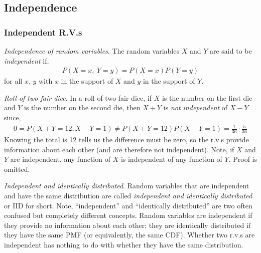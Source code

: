 \subsection{Independence}

\subsubsection{Independent R.V.s}

\emph{Independence of random variables}. 
 The random variables \(X\) and \(Y\) are said to be \emph{independent} if,
\begin{align}
P(X = x,\ Y = y) = P(X = x)P(Y = y)
\end{align}
for all \(x\), \(y\) with \(x\) in the support of \(X\) and \(y\) in the support of \(Y\).

\emph{Roll of two fair dice}. 
In a roll of two fair dice, 
if \(X\) is the number on the first die and \(Y\) is the number on the second die,
then \(X + Y\) is \emph{not independent} of \(X - Y\) since,
\begin{align}
0 = P(X + Y = 12,X - Y = 1) \neq P(X + Y = 12)P(X - Y = 1) = \frac{1}{36} \cdot \frac{5}{36}
\end{align}
Knowing the total is 12 tells us the difference must be zero, 
so the r.v.s provide information about each other (and are therefore not independent). 
Note, if \(X\) and \(Y\) are independent, any function of
\(X\) is independent of any function of \(Y\). 
Proof is omitted.

\emph{Independent and identically distributed}. 
Random variables that are independent and have the same distribution 
are called \emph{independent and identically distributed} or IID for short.
Note, ``independent'' and ``identically distributed'' 
are two often confused but completely different concepts. 
Random variables are independent if they provide no information about each other; 
they are identically distributed if they have the same PMF (or equivalently, the same CDF). 
Whether two r.v.s are independent has nothing to do with
whether they have the same distribution.


